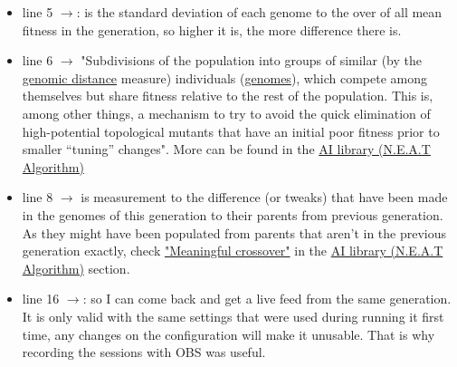 \begin{itemize}
\item line 5 $\rightarrow$: is the standard deviation of each genome to the over of all mean fitness in the generation, so higher it is, the more difference there is.


\item line 6 $\rightarrow$ "Subdivisions of the population into groups of similar (by the \href{https://neat-python.readthedocs.io/en/latest/glossary.html#term-genomic-distance}{genomic distance} measure) individuals (\href{https://neat-python.readthedocs.io/en/latest/glossary.html#term-genome}{genomes}), which compete among themselves but share fitness relative to the rest of the population. This is, among other things, a mechanism to try to avoid the quick elimination of high-potential topological mutants that have an initial poor fitness prior to smaller “tuning” changes". More can be found in the \hyperref[sec:ai-library-neat-algorithm]{AI library (N.E.A.T Algorithm)}


\item line 8 $\rightarrow$ is measurement to the difference (or tweaks) that have been made in the genomes of this generation to their parents from previous generation. As they might have been populated from parents that aren't in the previous generation exactly, check \hyperref[list:3tweanns]{"Meaningful crossover"} in the \hyperref[sec:ai-library-neat-algorithm]{AI library (N.E.A.T Algorithm)} section.

\item line 16 $\rightarrow$: so I can come back and get a live feed from the same generation. It is only valid with the same settings that were used during running it first time, any changes on the configuration will make it unusable. That is why recording the sessions with OBS was useful.
\end{itemize}
 
 
 
 
 
 
 
 
 
 
